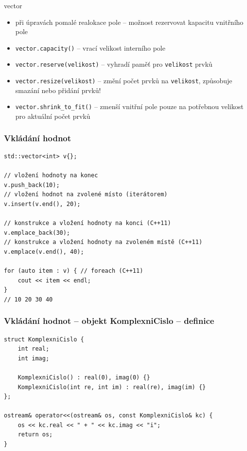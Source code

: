 \begin{frame}[fragile]
\begin{block}{vector}
\begin{itemize}
\item při úpravách pomalé realokace pole -- možnost rezervovat kapacitu vnitřního pole
\item \lstinline|vector.capacity()| -- vrací velikost interního pole
\item \lstinline|vector.reserve(velikost)| -- vyhradí paměť pro \lstinline|velikost| prvků
\item \lstinline|vector.resize(velikost)| -- změní počet prvků na \lstinline|velikost|, způsobuje smazání nebo přidání prvků!
\item \lstinline|vector.shrink_to_fit()| -- zmenší vnitřní pole pouze na potřebnou velikost pro aktuální počet prvků
\end{itemize}
\end{block}
\end{frame}



\begin{frame}[fragile]
\frametitle{Vkládání hodnot}
\begin{yesblock}
\begin{lstlisting}
std::vector<int> v{};

// vložení hodnoty na konec
v.push_back(10);
// vložení hodnot na zvolené místo (iterátorem)
v.insert(v.end(), 20);

// konstrukce a vložení hodnoty na konci (C++11)
v.emplace_back(30);
// konstrukce a vložení hodnoty na zvoleném místě (C++11)
v.emplace(v.end(), 40);

for (auto item : v) { // foreach (C++11)
	cout << item << endl; 
}
// 10 20 30 40
\end{lstlisting}
\end{yesblock}
\end{frame}


\begin{frame}[fragile]
\frametitle{Vkládání hodnot -- objekt KomplexniCislo -- definice}
\begin{yesblock}
\begin{lstlisting}
struct KomplexniCislo {
	int real;
	int imag;

	KomplexniCislo() : real(0), imag(0) {}
	KomplexniCislo(int re, int im) : real(re), imag(im) {}
};

ostream& operator<<(ostream& os, const KomplexniCislo& kc) {
	os << kc.real << " + " << kc.imag << "i";
	return os;
}
\end{lstlisting}
\end{yesblock}
\end{frame}

